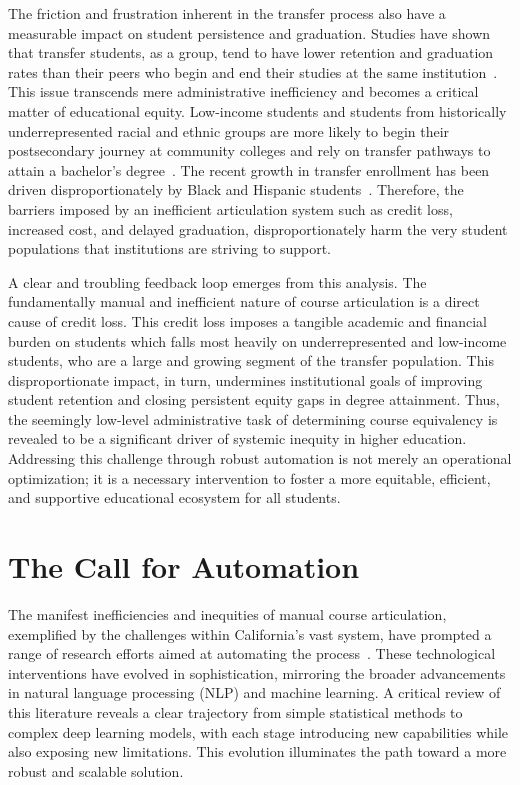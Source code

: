 \begin{introduction}
The friction and frustration inherent in the transfer process also have a measurable impact on student persistence and graduation. Studies have shown that transfer students, as a group, tend to have lower retention and graduation rates than their peers who begin and end their studies at the same institution~\cite{porter1999}. This issue transcends mere administrative inefficiency and becomes a critical matter of educational equity. Low-income students and students from historically underrepresented racial and ethnic groups are more likely to begin their postsecondary journey at community colleges and rely on transfer pathways to attain a bachelor's degree~\cite{ace2025}. The recent growth in transfer enrollment has been driven disproportionately by Black and Hispanic students~\cite{nscnews2023}. Therefore, the barriers imposed by an inefficient articulation system such as credit loss, increased cost, and delayed graduation, disproportionately harm the very student populations that institutions are striving to support.

A clear and troubling feedback loop emerges from this analysis. The fundamentally manual and inefficient nature of course articulation is a direct cause of credit loss. This credit loss imposes a tangible academic and financial burden on students which falls most heavily on underrepresented and low-income students, who are a large and growing segment of the transfer population. This disproportionate impact, in turn, undermines institutional goals of improving student retention and closing persistent equity gaps in degree attainment. Thus, the seemingly low-level administrative task of determining course equivalency is revealed to be a significant driver of systemic inequity in higher education. Addressing this challenge through robust automation is not merely an operational optimization; it is a necessary intervention to foster a more equitable, efficient, and supportive educational ecosystem for all students.

\section{The Call for Automation}
The manifest inefficiencies and inequities of manual course articulation, exemplified by the challenges within California's vast system, have prompted a range of research efforts aimed at automating the process~\cite{ma_course_recommendation_2017, PardosCourse2Vec2019, pardos-articulation-2019, JiangPardosMulti2VecEDM2020,XuPardosSubwordEmbeddings2024}. These technological interventions have evolved in sophistication, mirroring the broader advancements in natural language processing (NLP) and machine learning. A critical review of this literature reveals a clear trajectory from simple statistical methods to complex deep learning models, with each stage introducing new capabilities while also exposing new limitations. This evolution illuminates the path toward a more robust and scalable solution.


\end{introduction}
